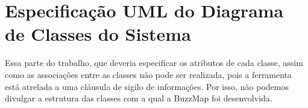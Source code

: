 \section{Especificação UML do Diagrama de Classes do Sistema}

Essa parte do trabalho, que deveria especificar os atributos de cada classe,
assim como as associações entre as classes não pode ser realizada, pois a
ferramenta está atrelada a uma cláusula de sigilo de informações. Por isso,
não podemos divulgar a estrutura das classes com a qual a BuzzMap foi
desenvolvida.

